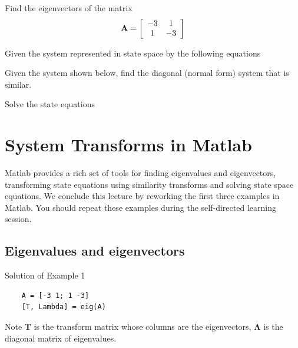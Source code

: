 \ifslidesonly
\begin{slide}
\end{slide}
\begin{slide}
Find the eigenvectors of the matrix
\begin{displaymath}
	{\bf{A}} = \left[ {\begin{array}{*{20}c}
	   { - 3} & 1  \\
	   1 & { - 3}  \\
	\end{array}} \right]
\end{displaymath}
\end{slide}
\begin{slide}
Given the system represented in state space by the following equations

\end{slide}
\begin{slide}
Given the system shown below, find the diagonal (normal form) system that is similar.

\end{slide}
\begin{slide}
Solve the state equations

\end{slide}
\fi

\section*{System Transforms in Matlab}

Matlab provides a rich set of tools for finding eigenvalues and eigenvectors, transforming state equations using similarity transforms and solving state space equations. We conclude this lecture by reworking the first three examples in Matlab. You should repeat these examples during the self-directed learning session.

\subsection*{Eigenvalues and eigenvectors}

\ifslidesonly
\begin{slide}
\end{slide}
\fi
\begin{slide}
   Solution of Example 1
   \begin{verbatim}
	A = [-3 1; 1 -3]
	[T, Lambda] = eig(A)
   \end{verbatim}
	Note $\mathbf{T}$ is the transform matrix whose columns are the eigenvectors, $\mathbf{\Lambda}$ is the diagonal matrix of eigenvalues.
\end{slide}

